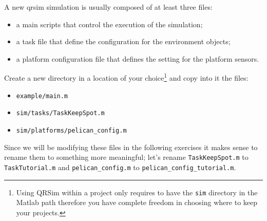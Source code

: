 \documentclass[a4paper,11pt]{article}
\begin{document}
A new qrsim simulation is usually composed of at least three files:
\begin{itemize}
 \item a main scripts that control the execution of the simulation;
 \item a task file that define the configuration for the environment objects;
 \item a platform configuration file that defines the setting for the platform sensors.
\end{itemize}
Create a new directory in a location of your choice\footnote{Using QRSim within a project only requires to have the \texttt{sim} directory in the Matlab path therefore you have complete freedom in choosing where to keep your projects.} and copy into it the files:
\begin{itemize}
 \item \texttt{example/main.m}
 \item \texttt{sim/tasks/TaskKeepSpot.m}
 \item \texttt{sim/platforms/pelican\_config.m}
\end{itemize}
Since we will be modifying these files in the following exercises it makes sense to rename them to something more meaningful; let's rename \texttt{TaskKeepSpot.m} to \texttt{TaskTutorial.m} and \texttt{pelican\_config.m} to \texttt{pelican\_config\_tutorial.m}.
\end{document}
